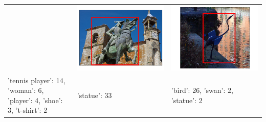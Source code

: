 \documentclass[11pt,a4paper]{article}
\begin{document}
\begin{table}[t]
\begin{tabularx}{\textwidth}{XXX}
		& \includegraphics[width=0.6\columnwidth]{images/2362660_2481248_supercat_unique.png}
		& \includegraphics[width=0.6\columnwidth]{images/2332099_3492153_singleton_obj.png}\\
		'tennis player': 14, 'woman': 6, 'player': 4, 'shoe': 3, 't-shirt': 2
		& 'statue': 33
		& 'bird': 26, 'swan': 2, 'statue': 2
		\\
	
	\end{tabularx}
	\caption{\label{tab:player_statue} }
\end{table}
\end{document}
